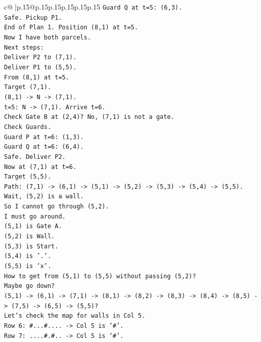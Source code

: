 \documentclass{article}
\begin{document}
{\begin{supertabular}{c@{$\;$}|p{.15\linewidth}@{}p{.15\linewidth}p{.15\linewidth}p{.15\linewidth}p{.15\linewidth}p{.15\linewidth}}
{{{\texttt{Guard Q at t=5: (6,3).} \\
\texttt{Safe. Pickup P1.} \\
\texttt{End of Plan 1. Position (8,1) at t=5.} \\
\texttt{Now I have both parcels.} \\
\texttt{Next steps:} \\
\texttt{Deliver P2 to (7,1).} \\
\texttt{Deliver P1 to (5,5).} \\
\texttt{From (8,1) at t=5.} \\
\texttt{Target (7,1).} \\
\texttt{(8,1) {-}> N {-}> (7,1).} \\
\texttt{t=5: N {-}> (7,1). Arrive t=6.} \\
\texttt{Check Gate B at (2,4)? No, (7,1) is not a gate.} \\
\texttt{Check Guards.} \\
\texttt{Guard P at t=6: (1,3).} \\
\texttt{Guard Q at t=6: (6,4).} \\
\texttt{Safe. Deliver P2.} \\
\texttt{Now at (7,1) at t=6.} \\
\texttt{Target (5,5).} \\
\texttt{Path: (7,1) {-}> (6,1) {-}> (5,1) {-}> (5,2) {-}> (5,3) {-}> (5,4) {-}> (5,5).} \\
\texttt{Wait, (5,2) is a wall.} \\
\texttt{So I cannot go through (5,2).} \\
\texttt{I must go around.} \\
\texttt{(5,1) is Gate A.} \\
\texttt{(5,2) is Wall.} \\
\texttt{(5,3) is Start.} \\
\texttt{(5,4) is '.'.} \\
\texttt{(5,5) is 'x'.} \\
\texttt{How to get from (5,1) to (5,5) without passing (5,2)?} \\
\texttt{Maybe go down?} \\
\texttt{(5,1) {-}> (6,1) {-}> (7,1) {-}> (8,1) {-}> (8,2) {-}> (8,3) {-}> (8,4) {-}> (8,5) {-}> (7,5) {-}> (6,5) {-}> (5,5)?} \\
\texttt{Let's check the map for walls in Col 5.} \\
\texttt{Row 6: \#...\#.... {-}> Col 5 is '\#'.} \\
\texttt{Row 7: ....\#.\#.. {-}> Col 5 is '\#'.} \\
}}}
\end{supertabular}}
\end{document}
